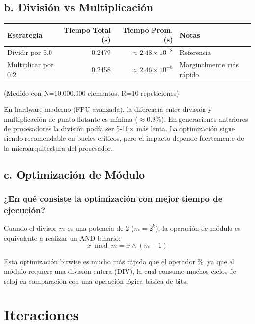 \documentclass[11pt,a4paper]{article}
\begin{document}
\subsection*{b. División vs Multiplicación}

\begin{center}
\begin{tabular}{|l|r|r|l|}
\hline
\textbf{Estrategia} & \textbf{Tiempo Total (s)} & \textbf{Tiempo Prom. (s)} & \textbf{Notas} \\
\hline
Dividir por 5.0     & 0.2479 & $\approx 2.48 \times 10^{-8}$ & Referencia \\
Multiplicar por 0.2 & 0.2458 & $\approx 2.46 \times 10^{-8}$ & Marginalmente más rápido \\
\hline
\end{tabular}
\end{center}

(Medido con N=10.000.000 elementos, R=10 repeticiones)

En hardware moderno (FPU avanzada), la diferencia entre división y multiplicación de punto flotante es mínima ($\approx 0.8\%$). En generaciones anteriores de procesadores la división podía ser 5-10$\times$ más lenta. La optimización sigue siendo recomendable en bucles críticos, pero el impacto depende fuertemente de la microarquitectura del procesador.

\subsection*{c. Optimización de Módulo}

\subsubsection*{¿En qué consiste la optimización con mejor tiempo de ejecución?}

Cuando el divisor $m$ es una potencia de 2 ($m = 2^k$), la operación de módulo es equivalente a realizar un AND binario:
$$x \bmod m = x \land (m-1)$$

Esta optimización bitwise es mucho más rápida que el operador \%, ya que el módulo requiere una división entera (DIV), la cual consume muchos ciclos de reloj en comparación con una operación lógica básica de bits.

\section{Iteraciones}
\end{document}
